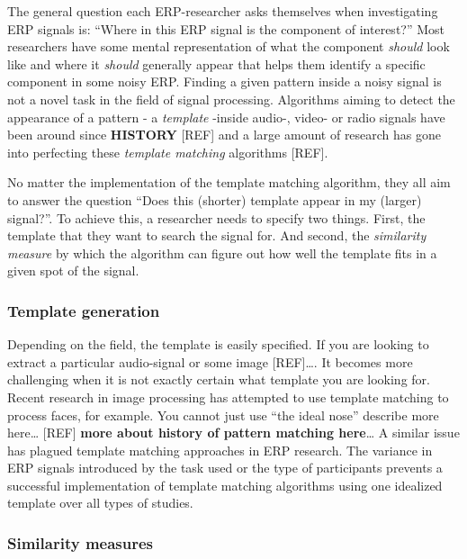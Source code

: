 \documentclass[
  man,floatsintext]{apa7}
\begin{document}
The general question each ERP-researcher asks themselves when investigating ERP signals is: ``Where in this ERP signal is the component of interest?'' Most researchers have some mental representation of what the component \emph{should} look like and where it \emph{should} generally appear that helps them identify a specific component in some noisy ERP.
Finding a given pattern inside a noisy signal is not a novel task in the field of signal processing. Algorithms aiming to detect the appearance of a pattern - a \emph{template} -inside audio-, video- or radio signals have been around since \textbf{HISTORY} {[}REF{]} and a large amount of research has gone into perfecting these \emph{template matching} algorithms {[}REF{]}.

No matter the implementation of the template matching algorithm, they all aim to answer the question ``Does this (shorter) template appear in my (larger) signal?''. To achieve this, a researcher needs to specify two things. First, the template that they want to search the signal for. And second, the \emph{similarity measure} by which the algorithm can figure out how well the template fits in a given spot of the signal.

\hypertarget{template-generation}{%
\subsubsection{Template generation}\label{template-generation}}

Depending on the field, the template is easily specified. If you are looking to extract a particular audio-signal or some image {[}REF{]}\ldots. It becomes more challenging when it is not exactly certain what template you are looking for. Recent research in image processing has attempted to use template matching to process faces, for example. You cannot just use ``the ideal nose'' describe more here\ldots{} {[}REF{]} \textbf{more about history of pattern matching here}\ldots{} A similar issue has plagued template matching approaches in ERP research. The variance in ERP signals introduced by the task used or the type of participants prevents a successful implementation of template matching algorithms using one idealized template over all types of studies.

\hypertarget{similarity-measures}{%
\subsubsection{Similarity measures}\label{similarity-measures}}
\end{document}
